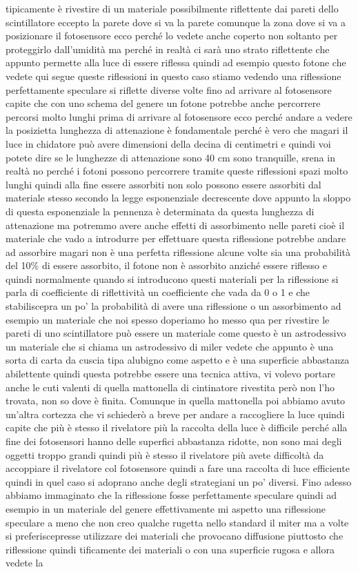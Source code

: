 {tipicamente è rivestire di un materiale possibilmente riflettente dai pareti dello scintillatore eccepto la parete dove si va la parete comunque la zona dove si va a posizionare il fotosensore ecco perché lo vedete anche coperto non soltanto per proteggirlo dall'umidità ma perché in realtà ci sarà uno strato riflettente che appunto permette alla luce di essere riflessa quindi ad esempio questo fotone che vedete qui segue queste riflessioni in questo caso stiamo vedendo una riflessione perfettamente speculare si riflette diverse volte fino ad arrivare al fotosensore capite che con uno schema del genere un fotone potrebbe anche percorrere percorsi molto lunghi prima di arrivare al fotosensore ecco perché andare a vedere la posizietta lunghezza di attenazione è fondamentale perché è vero che magari il luce in chidatore può avere dimensioni della decina di centimetri e quindi voi potete dire se le lunghezze di attenazione sono 40 cm sono tranquille, srena in realtà no perché i fotoni possono percorrere tramite queste riflessioni spazi molto lunghi quindi alla fine essere assorbiti non solo possono essere assorbiti dal materiale stesso secondo la legge esponenziale decrescente dove appunto la sloppo di questa esponenziale la pennenza è determinata da questa lunghezza di attenazione ma potremmo avere anche effetti di assorbimento nelle pareti cioè il materiale che vado a introdurre per effettuare questa riflessione potrebbe andare ad assorbire magari non è una perfetta riflessione alcune volte sia una probabilità del 10\% di essere assorbito, il fotone non è assorbito anziché essere riflesso e quindi normalmente quando si introducono questi materiali per la riflessione si parla di coefficiente di riflettività un coefficiente che vada da 0 o 1 e che stabiliscepra un po' la probabilità di avere una riflessione o un assorbimento ad esempio un materiale che noi spesso doperiamo ho messo qua per rivestire le pareti di uno scintillatore può essere un materiale come questo è un astrodessivo un materiale che si chiama un astrodessivo di miler vedete che appunto è una sorta di carta da cuscia tipa alubigno come aspetto e è una superficie abbastanza abilettente quindi questa potrebbe essere una tecnica attiva, vi volevo portare anche le cuti valenti di quella mattonella di cintinatore rivestita però non l'ho trovata, non so dove è finita. Comunque in quella mattonella poi abbiamo avuto un'altra cortezza che vi schiederò a breve per andare a raccogliere la luce quindi capite che più è stesso il rivelatore più la raccolta della luce è difficile perché alla fine dei fotosensori hanno delle superfici abbastanza ridotte, non sono mai degli oggetti troppo grandi quindi più è stesso il rivelatore più avete difficoltà da accoppiare il rivelatore col fotosensore quindi a fare una raccolta di luce efficiente quindi in quel caso si adoprano anche degli strategiani un po' diversi. Fino adesso abbiamo immaginato che la riflessione fosse perfettamente speculare quindi ad esempio in un materiale del genere effettivamente mi aspetto una riflessione speculare a meno che non creo qualche rugetta nello standard il miter ma a volte si preferiscepresse utilizzare dei materiali che provocano diffusione piuttosto che riflessione quindi tificamente dei materiali o con una superficie rugosa e allora vedete la }

